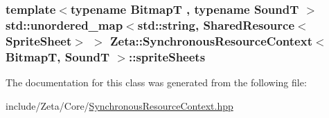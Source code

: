 \hypertarget{classZeta_1_1SynchronousResourceContext_a6039dc77546b72da03e229e2f1e48add}{
\subsubsection[{sprite\+Sheets}]{\setlength{\rightskip}{0pt plus 5cm}template$<$typename Bitmap\+T , typename Sound\+T $>$ std\+::unordered\+\_\+map$<$std\+::string, {\bf Shared\+Resource}$<${\bf Sprite\+Sheet}$>$ $>$ {\bf Zeta\+::\+Synchronous\+Resource\+Context}$<$ Bitmap\+T, Sound\+T $>$\+::sprite\+Sheets\hspace{0.3cm}{\ttfamily [private]}}}\label{classZeta_1_1SynchronousResourceContext_a6039dc77546b72da03e229e2f1e48add}


The documentation for this class was generated from the following file\+:\begin{DoxyCompactItemize}
\item 
include/\+Zeta/\+Core/\hyperlink{SynchronousResourceContext_8hpp}{Synchronous\+Resource\+Context.\+hpp}\end{DoxyCompactItemize}
